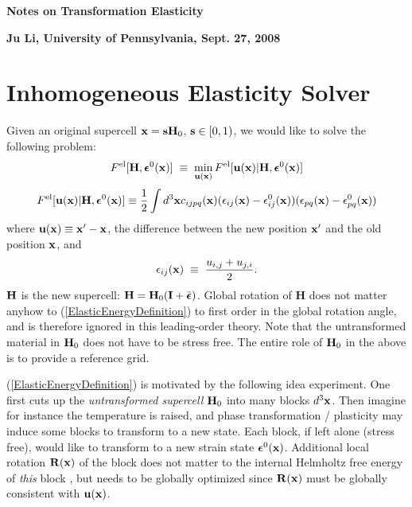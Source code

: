 \documentclass[12pt]{article}
\def\bmath#1{\mbox{\boldmath$#1$}}
\begin{document}


\newcommand{\URL}[1]{\href{#1}{#1}} 

\renewcommand\refname{References \\ ({\small
\URL{http://mt.seas.upenn.edu/Stuff/e/Notes/Paper/}
})}

\centerline{\LARGE\bf Notes on Transformation Elasticity} 

\centerline{\large\bf Ju Li, University of Pennsylvania, Sept. 27, 2008}

\section{Inhomogeneous Elasticity Solver}

Given an original supercell ${\bf x}={\bf s}{\bf H}_0$,
${\bf s}\in[0,1)$, we would like to solve the following problem:
\begin{equation}
 F^{\rm el}[{\bf H}, \bmath{\epsilon}^0({\bf x})] \;\equiv\; 
\min_{{\bf u}({\bf x})} 
F^{\rm el}[{\bf u}({\bf x}) | {\bf H}, \bmath{\epsilon}^0({\bf x})]
\end{equation}
\begin{equation}
F^{\rm el}[{\bf u}({\bf x}) | {\bf H}, \bmath{\epsilon}^0({\bf x})] \equiv
 \frac{1}{2}\int d^3{\bf x} c_{ijpq}({\bf x})
 ( \epsilon_{ij}({\bf x}) - \epsilon^0_{ij}({\bf x}) ) 
 ( \epsilon_{pq}({\bf x}) - \epsilon^0_{pq}({\bf x}) )
 \label{ElasticEnergyDefinition}
\end{equation}
where ${\bf u}({\bf x})\equiv {\bf x}^\prime - {\bf x}$, the
difference between the new position ${\bf x}^\prime$ and the old
position ${\bf x}$, and 
\begin{equation}
 \epsilon_{ij}({\bf x}) \;\equiv\; \frac{u_{i,j}+u_{j,i}}{2}.
 \label{LinearElasticStrainDefinition}
\end{equation}
${\bf H}$ is the new supercell: ${\bf H} = {\bf H}_0 ({\bf
I}+\bar{\bmath{\epsilon}})$.  Global rotation of {\bf H} does not
matter anyhow to (\ref{ElasticEnergyDefinition}) to first order in the
global rotation angle, and is therefore ignored in this leading-order
theory.  Note that the untransformed material in ${\bf H}_0$ does not
have to be stress free.  The entire role of ${\bf H}_0$ in the above
is to provide a reference grid.

(\ref{ElasticEnergyDefinition}) is motivated by the following idea
experiment.  One first cuts up the {\em untransformed supercell} ${\bf
H}_0$ into many blocks $d^3{\bf x}$.  Then imagine for instance the
temperature is raised, and phase transformation / plasticity may
induce some blocks to transform to a new state.  Each block, if left
alone (stress free), would like to transform to a new strain state
$\bmath{\epsilon}^0({\bf x})$. Additional local rotation ${\bf R}({\bf
x})$ of the block does not matter to the internal Helmholtz free
energy of {\em this} block \cite{WangLYPW95,LiPhDThesis00}, but needs
to be globally optimized since ${\bf R}({\bf x})$ must be globally
consistent with ${\bf u}({\bf x})$.
\end{document}
